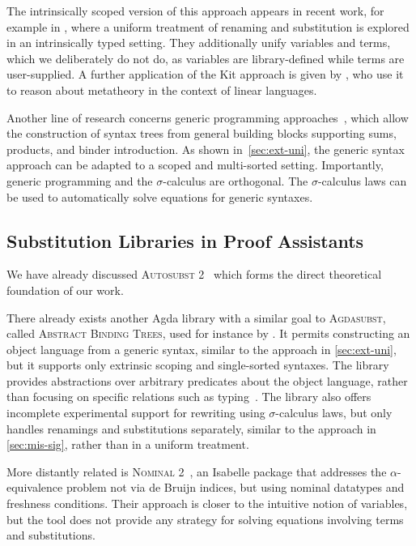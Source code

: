 \documentclass[screen,nonacm]{acmart}
\begin{document}
The intrinsically scoped version of this approach appears in recent work, for
example in \citet{altenkirch2025substitution}, where a uniform treatment of
renaming and substitution is explored in an intrinsically typed setting. They
additionally unify variables and terms, which we deliberately do not do, as
variables are library-defined while terms are user-supplied. A further
application of the Kit approach is given by \citet{Wood_2021}, who use it to
reason about metatheory in the context of linear languages.

Another line of research concerns generic programming
approaches~\cite{allais2021typescopesafeuniverse, 10.1145/3018610.3018613},
which allow the construction of syntax trees from general building blocks
supporting sums, products, and binder introduction. As shown
in~\cref{sec:ext-uni}, the generic syntax approach can be adapted to a scoped
and multi-sorted setting. Importantly, generic programming and the $σ$-calculus
are orthogonal. The $σ$-calculus laws can be used to automatically solve
equations for generic syntaxes.

\subsection*{Substitution Libraries in Proof Assistants}
We have already discussed \textsc{Autosubst 2}~\cite{10.1145/3293880.3294101,
      schafer2015autosubst, Stark:2020:Mechanising} which forms the direct
theoretical foundation of our work.

There already exists another Agda library with a similar goal to
\textsc{Agdasubst}, called \textsc{Abstract Binding Trees}, used for instance
by \citet{siek2021parameterized}. It permits constructing an object language
from a generic syntax, similar to the approach in \cref{sec:ext-uni}, but it
supports only extrinsic scoping and single-sorted syntaxes. The library
provides abstractions over arbitrary predicates about the object language,
rather than focusing on specific relations such as
typing~\cite{saffrich:LIPIcs.ITP.2024.32}. The library also offers incomplete
experimental support for rewriting using $\sigma$-calculus laws, but only
handles renamings and substitutions separately, similar to the approach in
\cref{sec:mis-sig}, rather than in a uniform treatment.

More distantly related is \textsc{Nominal 2}~\cite{Nominal2-AFP}, an Isabelle
package that addresses the $α$-equivalence problem not via de Bruijn indices,
but using nominal datatypes and freshness conditions. Their approach is closer
to the intuitive notion of variables, but the tool does not provide any
strategy for solving equations involving terms and substitutions.
\end{document}
